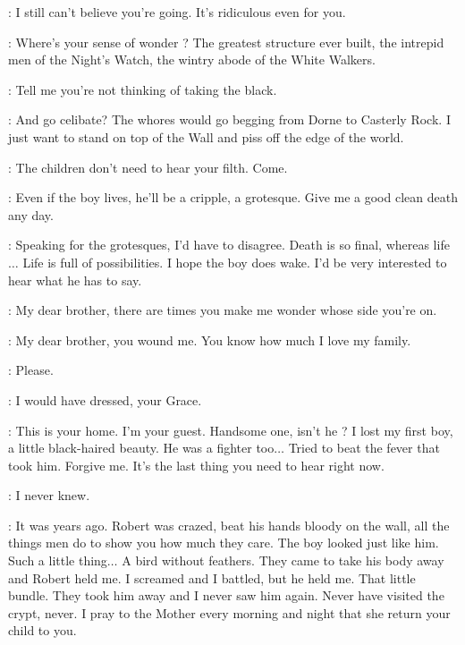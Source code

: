 \CERSEI: I still can't believe you're going. It's ridiculous even for you. 

\TYRION: Where's your sense of wonder ? The greatest structure ever built, the intrepid men of the Night's Watch, the wintry abode of the White Walkers. 

\JAIME: Tell me you're not thinking of taking the black. 

\TYRION: And go celibate? The whores would go begging from Dorne to Casterly Rock. I just want to stand on top of the Wall and piss off the edge of the world. 

\CERSEI: The children don't need to hear your filth. Come. 

\JAIME: Even if the boy lives, he'll be a cripple, a grotesque. Give me a good clean death any day. 

\TYRION: Speaking for the grotesques, I'd have to disagree. Death is so final, whereas life$\ldots$ Life is full of possibilities. I hope the boy does wake. I'd be very interested to hear what he has to say. 

\JAIME: My dear brother, there are times you make me wonder whose side you're on. 

\TYRION: My dear brother, you wound me. You know how much I love my family. 

\scene



\CERSEI: Please. 

\CATELYN: I would have dressed, your Grace. 

\CERSEI: This is your home. I'm your guest. Handsome one, isn't he ? I lost my first boy, a little black-haired beauty. He was a fighter too$\ldots$ Tried to beat the fever that took him. Forgive me. It's the last thing you need to hear right now. 

\CATELYN: I never knew. 

\CERSEI: It was years ago. Robert was crazed, beat his hands bloody on the wall, all the things men do to show you how much they care. The boy looked just like him. Such a little thing$\ldots$ A bird without feathers. They came to take his body away and Robert held me. I screamed and I battled, but he held me. That little bundle. They took him away and I never saw him again. Never have visited the crypt, never. I pray to the Mother every morning and night that she return your child to you. 


